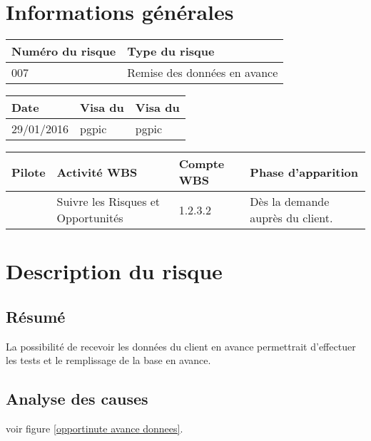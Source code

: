 
\section*{Informations générales}
 
\begin{table}[H]
\centering
	\begin{tabularx}{16.8cm}{|X|X|}
	\hline
	\rowcolor{gray!40} Numéro du risque & Type du risque \\
	\hline
	007 &  Remise des données en avance \\
	\hline
	\end{tabularx}
\end{table}

\begin{table}[H]
\centering
	\begin{tabularx}{16.8cm}{|X|X|X|}
	\hline
	\rowcolor{gray!40} Date & Visa du \RQ & Visa du \CP \\
	\hline
	 29/01/2016 & pgpic & pgpic \\
	\hline
	\end{tabularx}
\end{table}

\begin{table}[H]
\centering
	\begin{tabularx}{16.8cm}{|X|X|X|X|}
	\hline
	\rowcolor{gray!40} Pilote & Activité WBS & Compte WBS & Phase d'apparition \\
	\hline
	 \Sergi & Suivre les Risques et Opportunités & 1.2.3.2 & Dès la demande auprès du client.\\
	\hline
	\end{tabularx}
\end{table}

\section*{Description du risque}

\subsection*{Résumé}
	La possibilité de recevoir les données du client en avance permettrait d'effectuer les tests et le remplissage de la base en avance.
	
\subsection*{Analyse des causes}
	voir figure \ref{opportinute avance donnees}.


